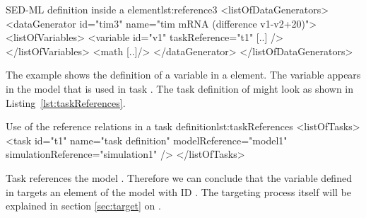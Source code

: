 \begin{myXmlLst}{SED-ML  definition inside a  element}{lst:reference3}
<listOfDataGenerators>
	<dataGenerator id="tim3" name="tim mRNA (difference v1-v2+20)">
	<listOfVariables>
   		<variable id="v1" taskReference="t1" [..] />
  	</listOfVariables>
  	<math [..]/>
	</dataGenerator>
</listOfDataGenerators>
\end{myXmlLst}

The example shows the definition of a variable  in a  element. The variable appears in the model that is used in task . The task definition of  might look as shown in Listing~\ref{lst:taskReferences}.

\begin{myXmlLst}{Use of the reference relations in a task definition}{lst:taskReferences}
<listOfTasks>
	<task id="t1" name="task definition" modelReference="model1" simulationReference="simulation1" />
</listOfTasks>
\end{myXmlLst}
Task  references the model . Therefore we can conclude that the variable  defined in  targets an element of the model with ID . The targeting process itself will be explained in section \ref{sec:target} on .

